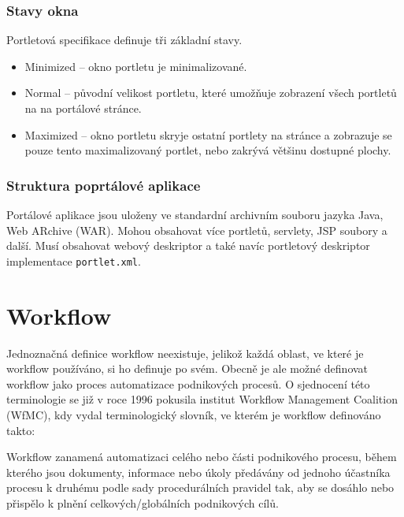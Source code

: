 \documentclass{fithesis}
\begin{document}
\subsection{Stavy okna}
Portletová specifikace definuje tři základní stavy.

\begin{itemize}
\item Minimized -- okno portletu je minimalizované.
\item Normal -- původní velikost portletu, které umožňuje zobrazení všech portletů na na portálové stránce.
\item Maximized -- okno portletu skryje ostatní portlety na stránce a zobrazuje se pouze tento maximalizovaný portlet, nebo zakrývá většinu dostupné plochy.
\end{itemize}

\subsection{Struktura poprtálové aplikace}
Portálové aplikace jsou uloženy ve standardní archivním souboru jazyka Java, Web ARchive (WAR). Mohou obsahovat více portletů, servlety, JSP soubory a další. Musí obsahovat webový deskriptor a také navíc portletový deskriptor implementace \verb|portlet.xml|.


















\chapter{Workflow}
Jednoznačná definice workflow neexistuje, jelikož každá oblast, ve které je workflow používáno, si ho definuje po svém. Obecně je ale možné definovat workflow jako proces automatizace podnikových procesů. O sjednocení této terminologie se již v roce 1996 pokusila institut Workflow Management Coalition (WfMC), kdy vydal terminologický slovník, ve kterém je workflow definováno takto: 

Workflow zanamená automatizaci celého nebo části podnikového procesu, během kterého jsou dokumenty, informace nebo úkoly předávány od jednoho účastníka procesu k druhému podle sady procedurálních pravidel tak, aby se dosáhlo nebo přispělo k plnění celkových/globálních podnikových cílů. \cite{wfmc}
\end{document}
